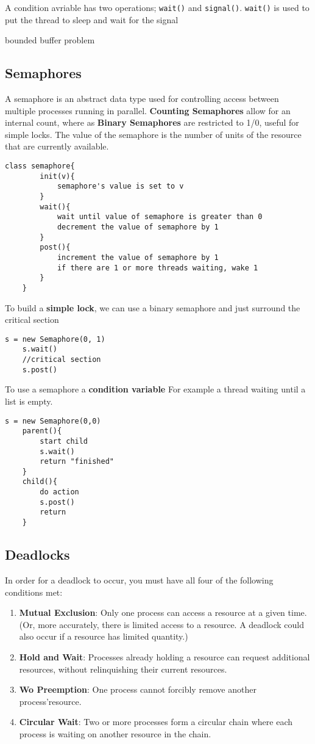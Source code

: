 \documentclass{article}
\begin{document}
	A condition avriable has two operations; \texttt{wait()} and \texttt{signal()}. \texttt{wait()} is used to put the thread to sleep and wait for the signal

	bounded buffer problem




	\subsection{Semaphores}
		A semaphore is an abstract data type used for controlling access between multiple processes running in parallel. {\bf Counting Semaphores} allow for an internal count, where as {\bf Binary Semaphores} are restricted to 1/0, useful for simple locks. The value of the semaphore is the number of units of the resource that are currently available.

		\begin{lstlisting}[style=pseudo]
	class semaphore{
		init(v){
			semaphore's value is set to v
		}
		wait(){
			wait until value of semaphore is greater than 0
			decrement the value of semaphore by 1
		}
		post(){
			increment the value of semaphore by 1
			if there are 1 or more threads waiting, wake 1
		}
	}
		\end{lstlisting}

		To build a {\bf simple lock}, we can use a binary semaphore and just surround the critical section
		\begin{lstlisting}[style=pseudo]
	s = new Semaphore(0, 1)
	s.wait()
	//critical section
	s.post()
		\end{lstlisting}

		To use a semaphore a {\bf condition variable} For example a thread waiting until a list is empty.

		\begin{lstlisting}[style=pseudo]
	s = new Semaphore(0,0)
	parent(){
		start child
		s.wait()
		return "finished"
	}
	child(){
		do action
		s.post()
		return
	}
		\end{lstlisting}




	\subsection{Deadlocks}
		In order for a deadlock to occur, you must have all four of the following conditions met:
		\begin{enumerate}
			\item {\bf Mutual Exclusion}: Only one process can access a resource at a given time. (Or, more accurately, there is limited access to a resource. A deadlock could also occur if a resource has limited quantity.)
			\item {\bf Hold and Wait}: Processes already holding a resource can request additional resources, without relinquishing their current resources.
			\item {\bf Wo Preemption}: One process cannot forcibly remove another process'resource.
			\item {\bf Circular Wait}: Two or more processes form a circular chain where each process is waiting on another resource in the chain.
		\end{enumerate}
\end{document}

